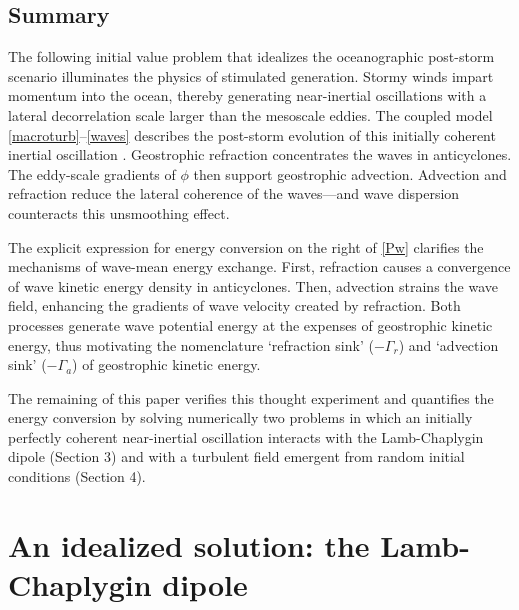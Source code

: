 \documentclass{jfm}
\begin{document}
\subsection{Summary}
The following initial value problem that idealizes the oceanographic post-storm scenario
illuminates the physics of stimulated generation. Stormy winds impart momentum
into the ocean, thereby generating near-inertial oscillations with a lateral
decorrelation scale larger than the mesoscale eddies. The coupled model
\eqref{macroturb}--\eqref{waves} describes the post-storm evolution
of this initially coherent inertial oscillation
 \citep{xie_vanneste2015,wagner_young2016}. Geostrophic refraction
concentrates the waves in anticyclones. The eddy-scale gradients of $\phi$ then support
geostrophic advection. Advection and refraction reduce the lateral coherence
of the waves---and wave dispersion counteracts this unsmoothing effect.

The explicit expression for energy
conversion on the right of \eqref{Pw} clarifies the mechanisms of wave-mean energy
exchange. First, refraction causes a convergence of wave kinetic energy density in
anticyclones. Then, advection strains the wave field, enhancing the gradients of
wave velocity created by refraction. Both
processes generate wave potential energy at the expenses of geostrophic kinetic
energy, thus motivating the nomenclature `refraction sink' ($-\Gamma_r$) and
`advection sink' ($-\Gamma_a$)  of geostrophic kinetic energy.

The remaining of this paper verifies this thought experiment and quantifies the
energy conversion by solving
numerically two problems in which an initially perfectly coherent near-inertial
oscillation interacts with the Lamb-Chaplygin dipole (Section 3) and with a turbulent
field emergent from random initial conditions (Section 4).

\section{An idealized solution: the Lamb-Chaplygin dipole}\label{dipole}
\end{document}
